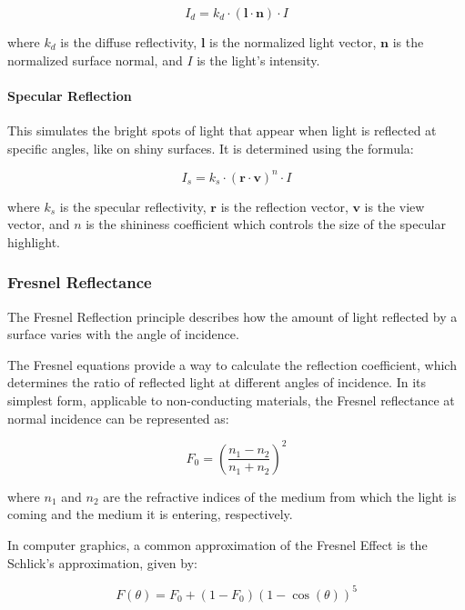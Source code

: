 \begin{equation}
\label{diffuse}
I_d = k_d \cdot (\mathbf{l} \cdot \mathbf{n}) \cdot I
\end{equation}

where $k_d$ is the diffuse reflectivity, $\mathbf{l}$ is the normalized light vector, $\mathbf{n}$ is the normalized surface normal, and $I$ is the light's intensity.
    
\paragraph{Specular Reflection} This simulates the bright spots of light that appear when light is reflected at specific angles, like on shiny surfaces. It is determined using the formula: 

\begin{equation}
\label{specular}
I_s = k_s \cdot (\mathbf{r} \cdot \mathbf{v})^n \cdot I
\end{equation}

where $k_s$ is the specular reflectivity, $\mathbf{r}$ is the reflection vector, $\mathbf{v}$ is the view vector, and $n$ is the shininess coefficient which controls the size of the specular highlight.

\subsubsection{Fresnel Reflectance}
\label{Fresnel}

The Fresnel Reflection principle describes how the amount of light reflected by a surface varies with the angle of incidence. 

The Fresnel equations provide a way to calculate the reflection coefficient, which determines the ratio of reflected light at different angles of incidence. In its simplest form, applicable to non-conducting materials, the Fresnel reflectance at normal incidence can be represented as:

\begin{equation}
F_0 = \left( \frac{n_1 - n_2}{n_1 + n_2} \right)^2
\end{equation}

where $n_1$ and  $n_2$ are the refractive indices of the medium from which the light is coming and the medium it is entering, respectively.

In computer graphics, a common approximation of the Fresnel Effect is the Schlick's approximation, given by:

\begin{equation}
\label{schlick}
F(\theta) = F_0 + (1 - F_0)(1 - \cos(\theta))^5
\end{equation}

